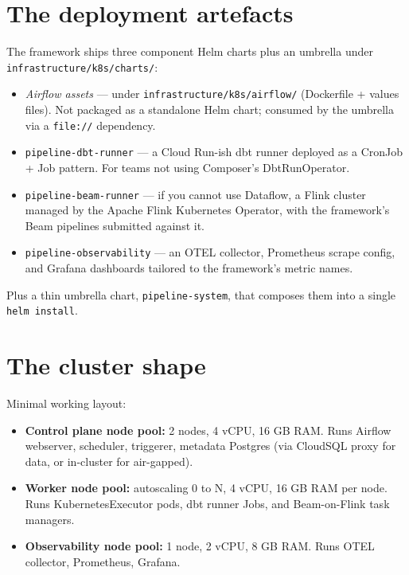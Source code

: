 \documentclass[
  11pt,
  british,
  oneside]{book}
\providecommand{\tightlist}{%
  \setlength{\itemsep}{0pt}\setlength{\parskip}{0pt}}
\begin{document}
\hypertarget{the-deployment-artefacts}{%
\section{The deployment artefacts}\label{the-deployment-artefacts}}

The framework ships three component Helm
charts plus an umbrella under
\texttt{infrastructure/k8s/charts/}:

\begin{itemize}
\tightlist
\item
  \emph{Airflow assets} --- under \texttt{infrastructure/k8s/airflow/}
  (Dockerfile + values files). Not packaged as a standalone Helm chart;
  consumed by the umbrella via a \texttt{file://} dependency.
\item
  \texttt{pipeline-dbt-runner} --- a Cloud Run-ish dbt runner deployed
  as a CronJob + Job pattern. For teams not using Composer's
  DbtRunOperator.
\item
  \texttt{pipeline-beam-runner} --- if you cannot use Dataflow, a Flink
  cluster managed by the Apache Flink Kubernetes Operator, with the
  framework's Beam pipelines submitted against it.
\item
  \texttt{pipeline-observability} --- an OTEL collector, Prometheus
  scrape config, and Grafana dashboards tailored to the framework's
  metric names.
\end{itemize}

Plus a thin umbrella chart, \texttt{pipeline-system}, that composes them
into a single \texttt{helm\ install}.

\hypertarget{the-cluster-shape}{%
\section{The cluster shape}\label{the-cluster-shape}}

Minimal working layout:

\begin{itemize}
\tightlist
\item
  \textbf{Control plane node pool:} 2 nodes, 4 vCPU, 16 GB RAM. Runs
  Airflow webserver, scheduler, triggerer, metadata Postgres (via
  CloudSQL proxy for data, or in-cluster for air-gapped).
\item
  \textbf{Worker node pool:} autoscaling 0 to N, 4 vCPU, 16 GB RAM per
  node. Runs KubernetesExecutor pods, dbt runner Jobs, and Beam-on-Flink
  task managers.
\item
  \textbf{Observability node pool:} 1 node, 2 vCPU, 8 GB RAM. Runs OTEL
  collector, Prometheus, Grafana.
\end{itemize}
\end{document}
